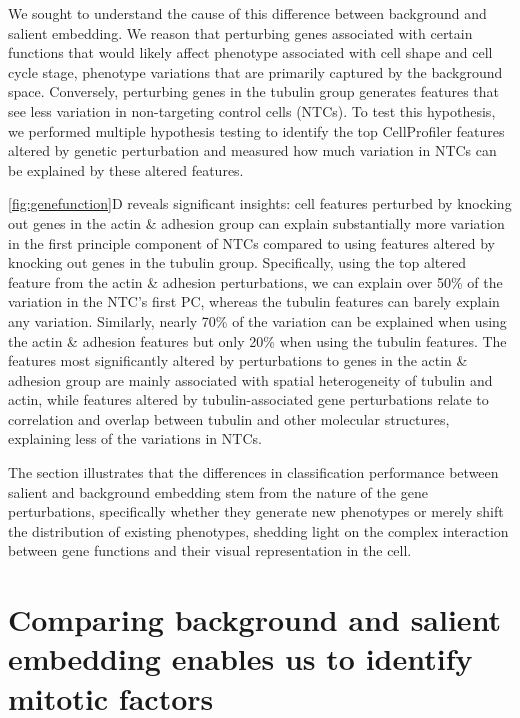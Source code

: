 \documentclass{article}
\begin{document}
We sought to understand the cause of this difference between background and salient embedding. We reason that perturbing genes associated with certain functions that would likely affect phenotype associated with cell shape and cell cycle stage, phenotype variations that are primarily captured by the background space. Conversely, perturbing genes in the tubulin group generates features that see less variation in non-targeting control cells (NTCs). To test this hypothesis, we performed multiple hypothesis testing to identify the top CellProfiler features altered by genetic perturbation and measured how much variation in NTCs can be explained by these altered features.

\autoref{fig:genefunction}D reveals significant insights: cell features perturbed by knocking out genes in the actin \& adhesion group can explain substantially more variation in the first principle component of NTCs compared to using features altered by knocking out genes in the tubulin group. Specifically, using the top altered feature from the actin \& adhesion perturbations, we can explain over 50\% of the variation in the NTC's first PC, whereas the tubulin features can barely explain any variation. Similarly, nearly 70\% of the variation can be explained when using the actin \& adhesion features but only 20\% when using the tubulin features. The features most significantly altered by perturbations to genes in the actin \& adhesion group are mainly associated with spatial heterogeneity of tubulin and actin, while features altered by tubulin-associated gene perturbations relate to correlation and overlap between tubulin and other molecular structures, explaining less of the variations in NTCs. 

The section illustrates that the differences in classification performance between salient and background embedding stem from the nature of the gene perturbations, specifically whether they generate new phenotypes or merely shift the distribution of existing phenotypes, shedding light on the complex interaction between gene functions and their visual representation in the cell.


\section*{Comparing background and salient embedding enables us to identify mitotic factors}
\end{document}
